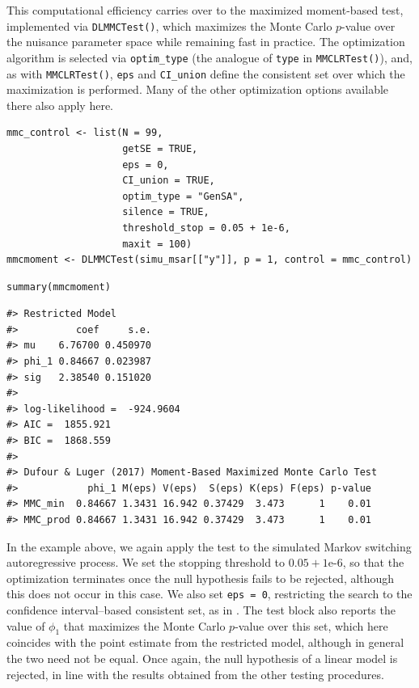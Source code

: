 This computational efficiency carries over to the maximized moment-based test, implemented via \texttt{DLMMCTest()}, which maximizes the Monte Carlo \(p\)-value over the nuisance parameter space while remaining fast in practice. The optimization algorithm is selected via \texttt{optim\_type} (the analogue of \texttt{type} in \texttt{MMCLRTest()}), and, as with \texttt{MMCLRTest()}, \texttt{eps} and \texttt{CI\_union} define the consistent set over which the maximization is performed. Many of the other optimization options available there also apply here.

\begin{verbatim}
mmc_control <- list(N = 99,
                    getSE = TRUE,
                    eps = 0,
                    CI_union = TRUE,
                    optim_type = "GenSA",
                    silence = TRUE,
                    threshold_stop = 0.05 + 1e-6,
                    maxit = 100)
mmcmoment <- DLMMCTest(simu_msar[["y"]], p = 1, control = mmc_control)
\end{verbatim}

\begin{verbatim}
summary(mmcmoment)
\end{verbatim}

\begin{verbatim}
#> Restricted Model
#>          coef     s.e.
#> mu    6.76700 0.450970
#> phi_1 0.84667 0.023987
#> sig   2.38540 0.151020
#> 
#> log-likelihood =  -924.9604
#> AIC =  1855.921
#> BIC =  1868.559
#> 
#> Dufour & Luger (2017) Moment-Based Maximized Monte Carlo Test
#>            phi_1 M(eps) V(eps)  S(eps) K(eps) F(eps) p-value
#> MMC_min  0.84667 1.3431 16.942 0.37429  3.473      1    0.01
#> MMC_prod 0.84667 1.3431 16.942 0.37429  3.473      1    0.01
\end{verbatim}

In the example above, we again apply the test to the simulated Markov switching autoregressive process. We set the stopping threshold to \(0.05 + 1\text{e-}6\), so that the optimization terminates once the null hypothesis fails to be rejected, although this does not occur in this case. We also set \texttt{eps\ =\ 0}, restricting the search to the confidence interval--based consistent set, as in \citet{dufourluger17}. The test block also reports the value of \(\phi_1\) that maximizes the Monte Carlo \(p\)-value over this set, which here coincides with the point estimate from the restricted model, although in general the two need not be equal. Once again, the null hypothesis of a linear model is rejected, in line with the results obtained from the other testing procedures.

